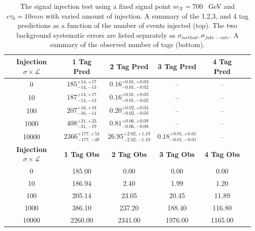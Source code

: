 \begin{table}
\caption{The signal injection test using a fixed signal point $m_{X} = 700$ ~GeV and $c\tau_0 = 10mm$ with varied amount of injection.
 A summary of the 1,2,3, and 4 tag predictions as a function of the number of events injected (top).  The two background systematic errors are
listed separately as $\sigma_{method},\sigma_{fake-rate}$. A summary of the observed number of tags (bottom). 
  \label{tab:700_injection_summary}}
\begin{center}
\begin{tabular}{cccccc}
\hline 
\textbf{Injection} $\sigma\times\mathcal{L}$  & \textbf{1 Tag Pred} & \textbf{2 Tag Pred} & \textbf{3 Tag Pred} &\textbf{4 Tag Pred} \\
\hline
0 &$ 185^{+14,+17}_{-14,-13} $&$0.16^{+0.01,+0.03}_{-0.01,-0.02}$& -- &-- \\
10 &$ 187^{+14,+17}_{-14,-13} $&$0.16^{+0.01,+0.03}_{-0.01,-0.02}$& -- &-- \\
100 &$ 207^{+16,+18}_{-16,-14} $&$0.20^{+0.02,+0.04}_{-0.02,-0.03} $&--&-- \\
1000 &$ 408^{+31,+23}_{-31,-19} $&$0.81^{+0.06,+0.09}_{-0.06,-0.08} $&--&-- \\
10000 &$ 2366^{+177,+53}_{-177,-49} $&$26.95^{+2.02,+1.19}_{-2.02,-1.10} $&$0.18^{+0.01,+0.01}_{-0.01,-0.01} $&-- \\
\hline 
\hline
\textbf{Injection} $\sigma\times\mathcal{L}$ & \textbf{1 Tag Obs} & \textbf{2 Tag Obs} & \textbf{3 Tag Obs} & \textbf{4 Tag Obs}\\
\hline
0 & 185.00 & 0.00 & 0.00 & 0.00 \\
10 & 186.94 & 2.40 & 1.99 & 1.20 \\ 
100 & 205.14 & 23.05 & 20.45 & 11.89 \\
1000 & 386.10 & 237.20 & 188.40 & 116.80 \\
10000 & 2260.00 & 2341.00 & 1976.00 & 1165.00 \\
\hline 
\end{tabular} 
\end{center}
\end{table}

